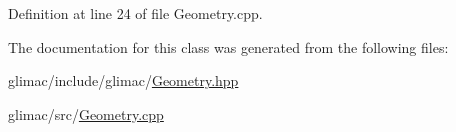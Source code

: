 Definition at line 24 of file Geometry.\+cpp.



The documentation for this class was generated from the following files\+:\begin{DoxyCompactItemize}
\item 
glimac/include/glimac/\hyperlink{_geometry_8hpp}{Geometry.\+hpp}\item 
glimac/src/\hyperlink{_geometry_8cpp}{Geometry.\+cpp}\end{DoxyCompactItemize}

